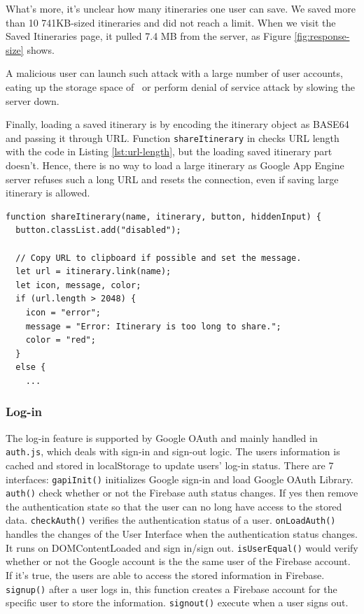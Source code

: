 \documentclass[12pt, a4paper]{article}
\newcommand{\code}[1]{\texttt{#1}}
\begin{document}
What's more, it's unclear how many itineraries one user can save. We saved more than 10 741KB-sized itineraries and did not reach a limit. When we visit the Saved Itineraries page, it pulled 7.4 MB from the server, as Figure \ref{fig:response-size} shows.

A malicious user can launch such attack with a large number of user accounts, eating up the storage space of \theproject\ or perform denial of service attack by slowing the server down.

Finally, loading a saved itinerary is by encoding the itinerary object as BASE64 and passing it through URL. Function \code{shareItinerary} in  checks URL length with the code in Listing \ref{lst:url-length}, but the loading saved itinerary part doesn't. Hence, there is no way to load a large itinerary as Google App Engine server refuses such a long URL and resets the connection, even if saving large itinerary is allowed.

\begin{lstlisting}[frame=tb, caption=Sharing itinerary checks the length of URL, label=lst:url-length]
function shareItinerary(name, itinerary, button, hiddenInput) {
  button.classList.add("disabled");

  // Copy URL to clipboard if possible and set the message.
  let url = itinerary.link(name);
  let icon, message, color;
  if (url.length > 2048) {
    icon = "error";
    message = "Error: Itinerary is too long to share.";
    color = "red";
  }
  else {
    ...
\end{lstlisting}

\subsubsection{Log-in}
The log-in feature is supported by Google OAuth and mainly handled in \code{auth.js}, which deals with sign-in and sign-out logic. The users information is cached and stored in localStorage to update users' log-in status.
There are 7 interfaces: 
\code{gapiInit()} initializes Google sign-in and load Google OAuth Library. 
\code{auth()} check whether or not the Firebase auth status changes. If yes then remove the authentication state so that the user can no long have access to the stored data.
\code{checkAuth()} verifies the authentication status of a user.
\code{onLoadAuth()} handles the changes of the User Interface when the authentication status changes. It runs on DOMContentLoaded and sign in/sign out.
\code{isUserEqual()} would verify whether or not the Google account is the the same user of the Firebase account. If it's true, the users are able to access the stored information in Firebase.
\code{signup()} after a user logs in, this function creates a Firebase account for the specific user to store the information.
\code{signout()} execute when a user signs out.
\end{document}
